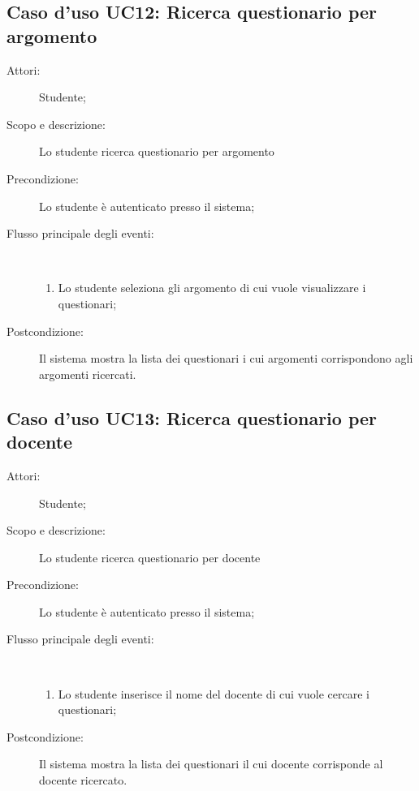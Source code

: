 \subsection{Caso d'uso UC12: Ricerca questionario per argomento}\begin{description}
\item[Attori:] Studente;
\item[Scopo e descrizione:] Lo studente ricerca questionario per argomento
      \item[Precondizione:] Lo studente è autenticato presso il sistema;

        \item[Flusso principale degli eventi:] \ 
 \begin{enumerate}
          \item Lo studente seleziona gli argomento di cui vuole visualizzare i questionari;

      \end{enumerate}
    \item[Postcondizione:] Il sistema mostra la lista dei questionari i cui argomenti corrispondono agli argomenti ricercati.
  \end{description}
\hypertarget{UC13}{}
\subsection{Caso d'uso UC13: Ricerca questionario per docente}\begin{description}
\item[Attori:] Studente;
\item[Scopo e descrizione:] Lo studente ricerca questionario per docente
      \item[Precondizione:] Lo studente è autenticato presso il sistema;

        \item[Flusso principale degli eventi:] \ 
 \begin{enumerate}
          \item Lo studente inserisce il nome del docente di cui vuole cercare i questionari;

      \end{enumerate}
    \item[Postcondizione:] Il sistema mostra la lista dei questionari il cui docente corrisponde al docente ricercato.
  \end{description}
\hypertarget{UC14}{}
